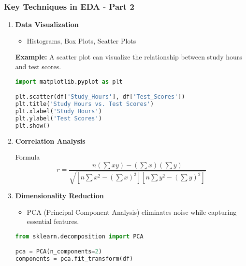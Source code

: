 \documentclass{beamer}
\begin{document}
\begin{frame}[fragile]
    \frametitle{Key Techniques in EDA - Part 2}
    \begin{enumerate}[resume]
        \item \textbf{Data Visualization}
        \begin{itemize}
            \item Histograms, Box Plots, Scatter Plots
        \end{itemize}
        \textbf{Example:} A scatter plot can visualize the relationship between study hours and test scores.
        \begin{lstlisting}[language=Python]
import matplotlib.pyplot as plt

plt.scatter(df['Study_Hours'], df['Test_Scores'])
plt.title('Study Hours vs. Test Scores')
plt.xlabel('Study Hours')
plt.ylabel('Test Scores')
plt.show()
        \end{lstlisting}

        \item \textbf{Correlation Analysis}
        \begin{block}{Formula}
            \begin{equation}
                r = \frac{n(\sum xy) - (\sum x)(\sum y)}{\sqrt{[n\sum x^2 - (\sum x)^2][n\sum y^2 - (\sum y)^2]}}
            \end{equation}
        \end{block}

        \item \textbf{Dimensionality Reduction}
        \begin{itemize}
            \item PCA (Principal Component Analysis) eliminates noise while capturing essential features.
        \end{itemize}
        \begin{lstlisting}[language=Python]
from sklearn.decomposition import PCA

pca = PCA(n_components=2)
components = pca.fit_transform(df)
        \end{lstlisting}
    \end{enumerate}
\end{frame}
\end{document}
